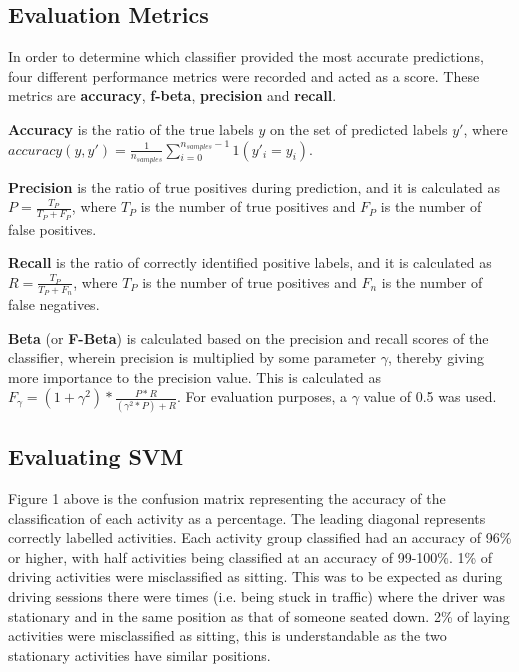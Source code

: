 \subsection{Evaluation Metrics}

In order to determine which classifier provided the most accurate predictions, four different performance metrics were recorded and acted as a score. These metrics are \textbf{accuracy},
\textbf{f-beta}, \textbf{precision} and \textbf{recall}.

\textbf{Accuracy} is the ratio of the true labels $y$ on the set of predicted labels $y'$, where \(accuracy(y, y') = \frac{1}{n_{samples}}\sum_{i=0}^{n_{samples}-1} 1(y'_i = y_i)\).

\textbf{Precision} is the ratio of true positives during prediction, and it is calculated as \(P = \frac{T_P}{T_P+F_P}\), where \(T_P\) is the number of true positives and \(F_P\) is the number of false positives.

\textbf{Recall} is the ratio of correctly identified positive labels, and it is calculated as \(R = \frac{T_P}{T_P+F_n}\), where \(T_P\) is the number of true positives and \(F_n\) is the number of false negatives.

\textbf{Beta} (or \textbf{F-Beta})  is calculated based on the precision and recall scores of the classifier, wherein precision is multiplied by some parameter $\gamma$, thereby giving more
importance to the precision value. This is calculated as \(F_\gamma = (1+\gamma^2) * \frac{P*R}{(\gamma^2*P)+R}\). For evaluation purposes, a $\gamma$ value of 0.5 was used.

\subsection{Evaluating SVM}

Figure 1 above is the confusion matrix representing the accuracy of the classification of each activity as a percentage. The leading diagonal represents correctly labelled activities. Each activity group classified had an accuracy of 96\% or higher, with half activities being classified at an accuracy of 99-100\%.
1\% of driving activities were misclassified as sitting. This was to be expected as during driving sessions there were times (i.e. being stuck in traffic) where the driver was stationary and in the same position as that of someone seated down.
2\% of laying activities were misclassified as sitting, this is understandable as the two stationary activities have similar positions.

